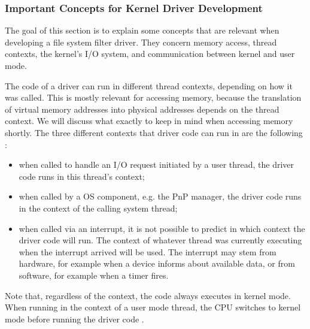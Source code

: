 \subsubsection{Important Concepts for Kernel Driver Development}
\label{chap:background.kerneldriver.concepts}
The goal of this section is to explain some concepts that are relevant when developing a file system filter driver. They concern memory access, thread contexts, the kernel's I/O system, and communication between kernel and user mode. 

The code of a driver can run in different thread contexts, depending on how it was called. This is mostly relevant for accessing memory, because the translation of virtual memory addresses into physical addresses depends on the thread context. We will discuss what exactly to keep in mind when accessing memory shortly. The three different contexts that driver code can run in are the following \cite{Yosifovich2017}:
\begin{itemize}
	\item when called to handle an I/O request initiated by a user thread, the driver code runs in this thread's context;
	\item when called by a OS component, e.g. the PnP manager, the driver code runs in the context of the calling system thread;
	\item when called via an interrupt, it is not possible to predict in which context the driver code will run. The context of whatever thread was currently executing when the interrupt arrived will be used. The interrupt may stem from hardware, for example when a device informs about available data, or from software, for example when a timer fires.
\end{itemize}
Note that, regardless of the context, the code always executes in kernel mode. When running in the context of a user mode thread, the CPU switches to kernel mode before running the driver code \cite{Yosifovich2017}.

